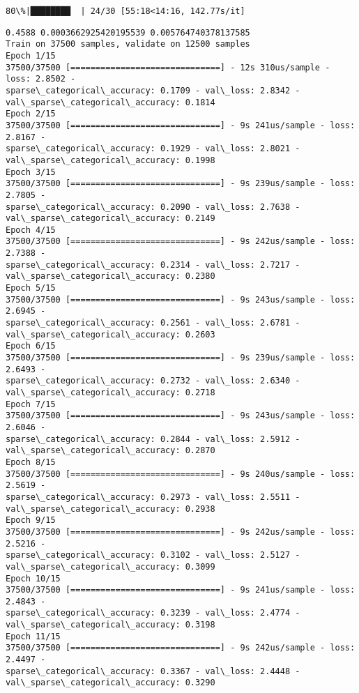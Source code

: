 \documentclass[11pt]{article}
\begin{document}
    \begin{Verbatim}[commandchars=\\\{\}]
 80\%|████████  | 24/30 [55:18<14:16, 142.77s/it]
    \end{Verbatim}

    \begin{Verbatim}[commandchars=\\\{\}]
0.4588 0.0003662925420195539 0.005764740378137585
Train on 37500 samples, validate on 12500 samples
Epoch 1/15
37500/37500 [==============================] - 12s 310us/sample - loss: 2.8502 -
sparse\_categorical\_accuracy: 0.1709 - val\_loss: 2.8342 -
val\_sparse\_categorical\_accuracy: 0.1814
Epoch 2/15
37500/37500 [==============================] - 9s 241us/sample - loss: 2.8167 -
sparse\_categorical\_accuracy: 0.1929 - val\_loss: 2.8021 -
val\_sparse\_categorical\_accuracy: 0.1998
Epoch 3/15
37500/37500 [==============================] - 9s 239us/sample - loss: 2.7805 -
sparse\_categorical\_accuracy: 0.2090 - val\_loss: 2.7638 -
val\_sparse\_categorical\_accuracy: 0.2149
Epoch 4/15
37500/37500 [==============================] - 9s 242us/sample - loss: 2.7388 -
sparse\_categorical\_accuracy: 0.2314 - val\_loss: 2.7217 -
val\_sparse\_categorical\_accuracy: 0.2380
Epoch 5/15
37500/37500 [==============================] - 9s 243us/sample - loss: 2.6945 -
sparse\_categorical\_accuracy: 0.2561 - val\_loss: 2.6781 -
val\_sparse\_categorical\_accuracy: 0.2603
Epoch 6/15
37500/37500 [==============================] - 9s 239us/sample - loss: 2.6493 -
sparse\_categorical\_accuracy: 0.2732 - val\_loss: 2.6340 -
val\_sparse\_categorical\_accuracy: 0.2718
Epoch 7/15
37500/37500 [==============================] - 9s 243us/sample - loss: 2.6046 -
sparse\_categorical\_accuracy: 0.2844 - val\_loss: 2.5912 -
val\_sparse\_categorical\_accuracy: 0.2870
Epoch 8/15
37500/37500 [==============================] - 9s 240us/sample - loss: 2.5619 -
sparse\_categorical\_accuracy: 0.2973 - val\_loss: 2.5511 -
val\_sparse\_categorical\_accuracy: 0.2938
Epoch 9/15
37500/37500 [==============================] - 9s 242us/sample - loss: 2.5216 -
sparse\_categorical\_accuracy: 0.3102 - val\_loss: 2.5127 -
val\_sparse\_categorical\_accuracy: 0.3099
Epoch 10/15
37500/37500 [==============================] - 9s 241us/sample - loss: 2.4843 -
sparse\_categorical\_accuracy: 0.3239 - val\_loss: 2.4774 -
val\_sparse\_categorical\_accuracy: 0.3198
Epoch 11/15
37500/37500 [==============================] - 9s 242us/sample - loss: 2.4497 -
sparse\_categorical\_accuracy: 0.3367 - val\_loss: 2.4448 -
val\_sparse\_categorical\_accuracy: 0.3290

\end{Verbatim}
\end{document}
